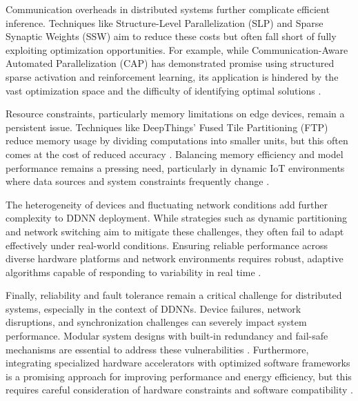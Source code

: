 \documentclass[conference]{IEEEtran}
\begin{document}
Communication overheads in distributed systems further complicate efficient inference. Techniques like Structure-Level Parallelization (SLP) and Sparse Synaptic Weights (SSW) aim to reduce these costs but often fall short of fully exploiting optimization opportunities. For example, while Communication-Aware Automated Parallelization (CAP) has demonstrated promise using structured sparse activation and reinforcement learning, its application is hindered by the vast optimization space and the difficulty of identifying optimal solutions \cite{zou2021cap}.

Resource constraints, particularly memory limitations on edge devices, remain a persistent issue. Techniques like DeepThings' Fused Tile Partitioning (FTP) reduce memory usage by dividing computations into smaller units, but this often comes at the cost of reduced accuracy \cite{zhao2018deepthings}. Balancing memory efficiency and model performance remains a pressing need, particularly in dynamic IoT environments where data sources and system constraints frequently change \cite{mohammed2020distributed, naveen2021low}.

The heterogeneity of devices and fluctuating network conditions add further complexity to DDNN deployment. While strategies such as dynamic partitioning and network switching aim to mitigate these challenges, they often fail to adapt effectively under real-world conditions. Ensuring reliable performance across diverse hardware platforms and network environments requires robust, adaptive algorithms capable of responding to variability in real time \cite{karjee2022split, li2019edge}.


Finally, reliability and fault tolerance remain a critical challenge for distributed systems, especially in the context of DDNNs. Device failures, network disruptions, and synchronization challenges can severely impact system performance. Modular system designs with built-in redundancy and fail-safe mechanisms are essential to address these vulnerabilities \cite{zeng2020coedge}. Furthermore, integrating specialized hardware accelerators with optimized software frameworks is a promising approach for improving performance and energy efficiency, but this requires careful consideration of hardware constraints and software compatibility \cite{kress2022hardware, naveen2021low}.




\end{document}
